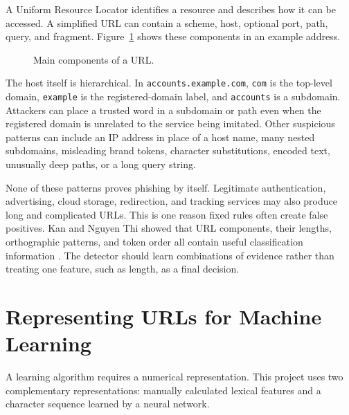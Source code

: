 A Uniform Resource Locator identifies a resource and describes how it can be
accessed. A simplified URL can contain a scheme, host, optional port, path,
query, and fragment. Figure~\ref{fig:url-anatomy} shows these components in an
example address.

\begin{figure}[htbp]
\centering
\footnotesize
{}
\caption{Main components of a URL.}
\label{fig:url-anatomy}
\end{figure}

The host itself is hierarchical. In \texttt{accounts.example.com},
\texttt{com} is the top-level domain, \texttt{example} is the registered-domain
label, and \texttt{accounts} is a subdomain. Attackers can place a trusted word
in a subdomain or path even when the registered domain is unrelated to the
service being imitated. Other suspicious patterns can include an IP address in
place of a host name, many nested subdomains, misleading brand tokens, character
substitutions, encoded text, unusually deep paths, or a long query string.

None of these patterns proves phishing by itself. Legitimate authentication,
advertising, cloud storage, redirection, and tracking services may also produce
long and complicated URLs. This is one reason fixed rules often create false
positives. Kan and Nguyen Thi showed that URL components, their lengths,
orthographic patterns, and token order all contain useful classification
information \citep{kan2005fast}. The detector should learn combinations of
evidence rather than treating one feature, such as length, as a final decision.

\section{Representing URLs for Machine Learning}

A learning algorithm requires a numerical representation. This project uses
two complementary representations: manually calculated lexical features and a
character sequence learned by a neural network.

